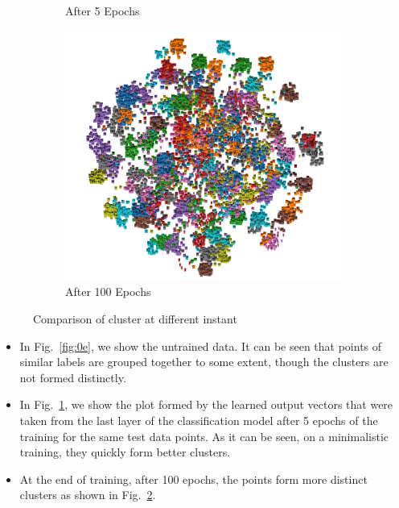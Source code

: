 \begin{figure}[h]
\begin{subfigure}[b]{0.3\textwidth}
  \caption{After 5 Epochs}
  \label{fig:5e}
\end{subfigure}
\hfill
\begin{subfigure}[b]{0.3\textwidth}
  \includegraphics[width=\textwidth]{figures/full_tsne.png}  
  \caption{After 100 Epochs}
  \label{fig:100e}
\end{subfigure}
    \caption{Comparison of cluster at different instant}
    \vspace*{-\baselineskip}
    \label{fig:clusters}
\end{figure}

\begin{itemize}
    \item In Fig.~\ref{fig:0e}, we show the untrained data. It can be seen that points of similar labels are grouped together to some extent, though the clusters are not formed distinctly.


    \item In Fig.~\ref{fig:5e}, we show the plot formed by the learned output vectors that were taken from the last layer of the classification model after 5 epochs of the training for the same test data points. As it can be seen, on a minimalistic training, they quickly form better clusters.
    \item At the end of training, after 100 epochs, the points form more distinct clusters as shown in Fig.~\ref{fig:100e}.
\end{itemize}


